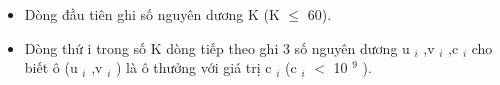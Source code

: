 \begin{itemize}
	\item Dòng đầu tiên ghi số nguyên dương K (K  $\le$  60).
	\item Dòng thứ i trong số K dòng tiếp theo ghi 3 số nguyên dương u $_ i $ ,v $_ i $ ,c $_ i $ cho biết ô (u $_ i $ ,v $_ i $ ) là ô thưởng với giá trị c $_ i $ (c $_ i $ $<$ 10 $^ 9 $ ).
\end{itemize}